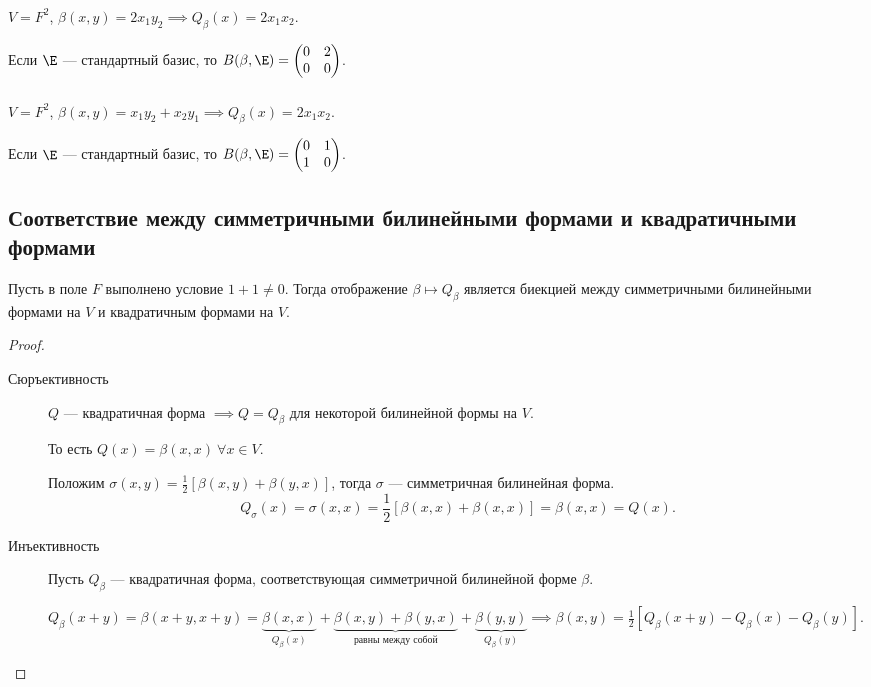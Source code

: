 \subsubsection{}

$V = F^2$, $\beta(x, y) = 2x_1 y_2 \implies Q_\beta(x) = 2x_1 x_2$.

Если $\E$ --- стандартный базис, то $B(\beta, \E) = \begin{pmatrix} 0 & 2 \\ 0 & 0 \end{pmatrix}$.

\subsubsection{}

$V = F^2$, $\beta(x, y) = x_1 y_2 + x_2 y_1 \implies Q_\beta(x) = 2x_1 x_2$.

Если $\E$ --- стандартный базис, то $B(\beta, \E) = \begin{pmatrix} 0 & 1 \\ 1 & 0 \end{pmatrix}$.


\subsection{Соответствие между симметричными билинейными формами и квадратичными формами}

\begin{proposal}
    Пусть в поле $F$ выполнено условие $1 + 1 \neq 0$. Тогда отображение $\beta \mapsto Q_\beta$ является биекцией между симметричными билинейными формами на $V$ и квадратичным формами на $V$.
\end{proposal}


\begin{proof}~
    \begin{description}
    \item[Сюръективность] $Q$ --- квадратичная форма $ \implies Q = Q_\beta$ для некоторой билинейной формы на $V$.

        То есть $Q(x) = \beta(x, x) \ \forall x \in V$.

        Положим $\sigma(x, y) = \frac{1}{2} \left[\beta(x, y) + \beta(y, x)\right]$, тогда $\sigma$ --- симметричная билинейная форма.
        \begin{equation*}
            Q_{\sigma} (x) =  \sigma(x, x) = \frac{1}{2}\left[\beta(x, x) + \beta(x, x)\right] = \beta(x, x) = Q (x)
        .\end{equation*}

    \item[Инъективность] Пусть $Q_{\beta}$ --- квадратичная форма, соответствующая симметричной билинейной форме $\beta$.

        $Q_\beta(x + y) = \beta(x + y, x + y) = \underbrace{\beta(x, x)}_{Q_\beta(x)} + \underbrace{\beta(x, y) + \beta(y, x)}_{\text{равны между собой}} + \underbrace{\beta(y, y)}_{Q_\beta(y)} \implies \beta(x, y) = \frac{1}{2} \left[Q_\beta(x + y) - Q_\beta(x) - Q_\beta(y)\right]$.
    \end{description}
\end{proof}


